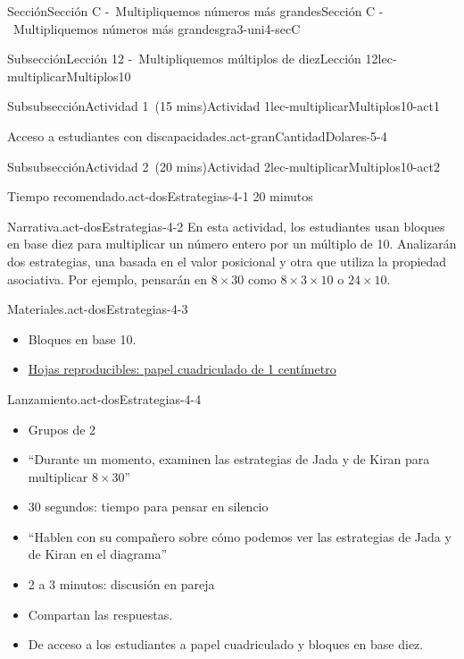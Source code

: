 \documentclass[oneside,10pt,]{article}
\begin{document}
\begin{sectionptx}{Sección}{Sección C -~Multipliquemos números más grandes}{}{Sección C -~Multipliquemos números más grandes}{}{}{gra3-uni4-secC}
\begin{subsectionptx}{Subsección}{Lección 12 -~Multipliquemos múltiplos de diez}{}{Lección 12}{}{}{lec-multiplicarMultiplos10}
\begin{subsubsectionptx}{Subsubsección}{Actividad 1~(15 mins)}{}{Actividad 1}{}{}{lec-multiplicarMultiplos10-act1}
\begin{paragraphs}{Acceso a estudiantes con discapacidades.}{act-granCantidadDolares-5-4}
\end{paragraphs}%
\end{subsubsectionptx}
%
%
\typeout{************************************************}
\typeout{************************************************}
%
\begin{subsubsectionptx}{Subsubsección}{Actividad 2~(20 mins)}{}{Actividad 2}{}{}{lec-multiplicarMultiplos10-act2}
\par
\begin{paragraphs}{Tiempo recomendado.}{act-dosEstrategias-4-1}%
20 minutos%
\end{paragraphs}%
\begin{paragraphs}{Narrativa.}{act-dosEstrategias-4-2}%
En esta actividad, los estudiantes usan bloques en base diez para multiplicar un número entero por un múltiplo de 10. Analizarán dos estrategias, una basada en el valor posicional y otra que utiliza la propiedad asociativa. Por ejemplo, pensarán en \(8 \times 30\) como \(8 \times 3 \times 10\) o \(24 \times 10\).%
\end{paragraphs}%
\begin{paragraphs}{Materiales.}{act-dosEstrategias-4-3}%
%
\begin{itemize}[label=\textbullet]
\item{}Bloques en base 10.%
\item{}\hyperref[blm-papelCuadriculadoCentimetro]{Hojas reproducibles: papel cuadriculado de 1 centímetro}%
\end{itemize}
\end{paragraphs}%
\begin{paragraphs}{Lanzamiento.}{act-dosEstrategias-4-4}%
%
\begin{itemize}[label=\textbullet]
\item{}Grupos de 2%
\item{}``Durante un momento, examinen las estrategias de Jada y de Kiran para multiplicar \(8 \times 30\)''%
\item{}30 segundos: tiempo para pensar en silencio%
\item{}``Hablen con su compañero sobre cómo podemos ver las estrategias de Jada y de Kiran en el diagrama''%
\item{}2 a 3 minutos: discusión en pareja%
\item{}Compartan las respuestas.%
\item{}De acceso a los estudiantes a papel cuadriculado y bloques en base diez.%
\end{itemize}
\end{paragraphs}%

\end{subsubsectionptx}
\end{subsectionptx}
\end{sectionptx}
\end{document}
